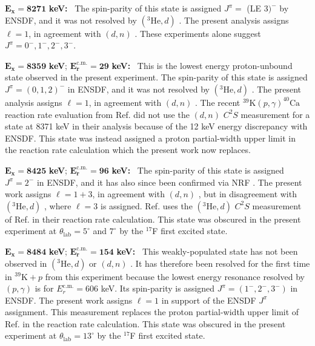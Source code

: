 \emph{$\mathbf{E_{x} = 8271}$} \textbf{keV:} \, 
The spin-parity of this state is assigned $J^{\pi} =$ (LE $3)^{-}$ by ENSDF, and it was not resolved by $(^{3}\mathrm{He},d)$ \cite{Erskine1966,Seth1967,Cage1971}. The present analysis assigns $\ell=1$, in agreement with $(d,n)$ \cite{Fuchs1969}. These experiments alone suggest $J^{\pi} = 0^{-},1^{-},2^{-},3^{-}$.

\emph{$\mathbf{E_{x} = 8359}$} \textbf{keV}; \emph{$\mathbf{E^{\boldsymbol{\mathrm{c.m.}}}_{r} = 29}$} \textbf{keV:} \, 
This is the lowest energy proton-unbound state observed in the present experiment. The spin-parity of this state is assigned $J^{\pi} = (0, 1, 2)^{-}$ in ENSDF, and it was not resolved by $(^{3}\mathrm{He},d)$ \cite{Erskine1966,Seth1967,Cage1971}. The present analysis assigns $\ell=1$, in agreement with $(d,n)$ \cite{Fuchs1969}. The recent  $^{39}\mathrm{K}(p, \gamma)^{40}\mathrm{Ca}$ reaction rate evaluation from Ref. \cite{Longland2018} did not use the $(d,n)$ \cite{Fuchs1969} $C^{2}S$ measurement for a state at 8371 keV in their analysis because of the 12 keV energy discrepancy with ENSDF. This state was instead assigned a proton partial-width upper limit in the reaction rate calculation which the present work now replaces.

\emph{$\mathbf{E_{x} = 8425}$} \textbf{keV}; \emph{$\mathbf{E^{\boldsymbol{\mathrm{c.m.}}}_{r} = 96}$} \textbf{keV:} \, 
The spin-parity of this state is assigned $J^{\pi} = 2^{-}$ in ENSDF, and it has also since been confirmed via NRF \cite{Gribble2022}. The present work assigns $\ell=1+3$, in agreement with $(d, n)$ \cite{Fuchs1969}, but in disagreement with $(^{3}\mathrm{He}, d)$ \cite{Erskine1966,Seth1967,Cage1971}, where $\ell=3$ is assigned. Ref. \cite{Longland2018} uses the $(^{3}\mathrm{He},d)$ $C^{2}S$ measurement of Ref. \cite{Cage1971} in their reaction rate calculation. This state was obscured in the present experiment at $\theta_{\mathrm{lab}} = 5^{\circ}$ and $7^{\circ}$ by the $^{17}$F first excited state.

\emph{$\mathbf{E_{x} = 8484}$} \textbf{keV}; \emph{$\mathbf{E^{\boldsymbol{\mathrm{c.m.}}}_{r} = 154}$} \textbf{keV:} \, 
This weakly-populated state has not been observed in $(^{3}\mathrm{He}, d)$ \cite{Erskine1966,Seth1967,Cage1971} or $(d, n)$ \cite{Fuchs1969}. It has therefore been resolved for the first time in $^{39}\mathrm{K}+p$ from this experiment because the lowest energy resonance resolved by $(p,\gamma)$ \cite{Kikstra1990,Cheng1981,Leenhouts1966} is for $E_{r}^{\mathrm{c.m.}} = 606$ keV. Its spin-parity is assigned $J^{\pi} = (1^{-},2^{-},3^{-})$ in ENSDF. The present work assigns $\ell=1$ in support of the ENSDF $J^{\pi}$ assignment. This measurement replaces the proton partial-width upper limit of Ref. \cite{Longland2018} in the reaction rate calculation. This state was obscured in the present experiment at $\theta_{\mathrm{lab}} = 13^{\circ}$ by the $^{17}$F first excited state.

